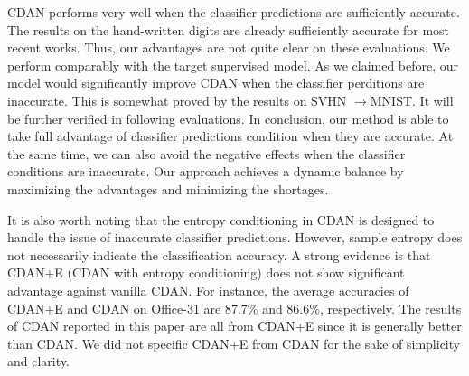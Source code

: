 \documentclass[sigconf]{acmart}
\begin{document}
CDAN performs very well when the classifier predictions are sufficiently accurate. The results on the hand-written digits are already sufficiently accurate for most recent works. Thus, our advantages are not quite clear on these evaluations. We perform comparably with the target supervised model. As we claimed before, our model would significantly improve CDAN when the classifier perditions are inaccurate. This is somewhat proved by the results on SVHN $\rightarrow$MNIST. It will be further verified in following evaluations. In conclusion, our method is able to take full advantage of classifier predictions condition when they are accurate. At the same time, we can also avoid the negative effects when the classifier conditions are inaccurate. Our approach achieves a dynamic balance by maximizing the advantages and minimizing the shortages.


It is also worth noting that the entropy conditioning in CDAN is designed to handle the issue of inaccurate classifier predictions. However, sample entropy does not necessarily indicate the classification accuracy. A strong evidence is that CDAN+E (CDAN with entropy conditioning) does not show significant advantage against vanilla CDAN. For instance, the average accuracies of CDAN+E and CDAN on Office-31 are 87.7\% and 86.6\%, respectively. The results of CDAN reported in this paper are all from CDAN+E since it is generally better than CDAN. We did not specific CDAN+E from CDAN for the sake of simplicity and clarity.
\end{document}
